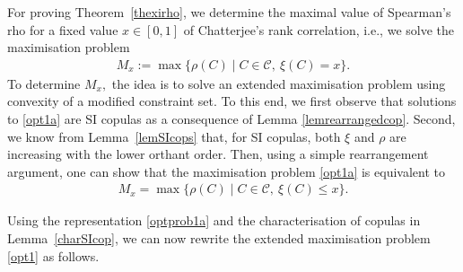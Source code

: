 \documentclass{article}
\theoremstyle{plain}
\theoremstyle{definition}
\begin{document}
For proving Theorem~\ref{thexirho}, we determine the maximal value of Spearman's rho for a fixed value \(x\in [0,1]\) of Chatterjee's rank correlation, i.e., we solve the maximisation problem 
\begin{align}\label{opt1a}
   M_x := \max\{\rho(C) \mid C\in \mathcal{C}, ~\xi(C) = x\}.
\end{align}
To determine \(M_x,\) the idea is to solve an extended maximisation problem using convexity of a modified constraint set.
To this end, we first observe that solutions to \eqref{opt1a} are SI copulas as a consequence of Lemma \ref{lemrearrangedcop}.
Second, we know from Lemma~\ref{lemSIcops} that, for SI copulas, both \(\xi\) and \(\rho\) are increasing with the lower orthant order.
Then, using a simple rearrangement argument, one can show that the maximisation problem \eqref{opt1a} is equivalent to
\begin{align}\label{opt1}
   M_x = \max\{\rho(C) \mid C\in \mathcal{C}, ~\xi(C) \le x\}.
\end{align}

Using the representation \eqref{optprob1a} and the characterisation of copulas in Lemma~\ref{charSIcop}, we can now rewrite the extended maximisation problem \eqref{opt1} as follows.
\end{document}
